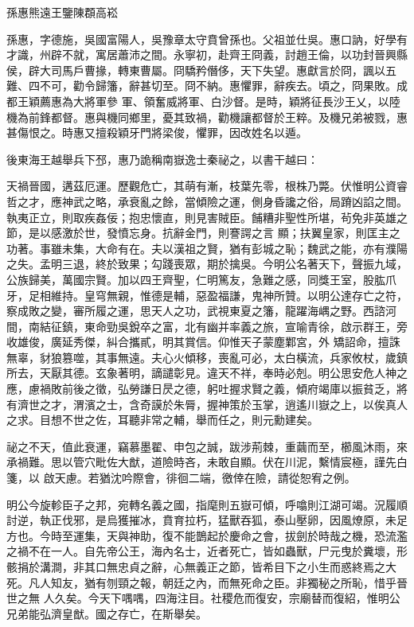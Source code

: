 
\begin{pinyinscope}

 孫惠熊遠王鑒陳頵高崧



 孫惠，字德施，吳國富陽人，吳豫章太守賁曾孫也。父祖並仕吳。惠口訥，好學有才識，州辟不就，寓居蕭沛之間。永寧初，赴齊王冏義，討趙王倫，以功封晉興縣侯，辟大司馬戶曹掾，轉東曹屬。冏驕矜僭侈，天下失望。惠獻言於冏，諷以五難、四不可，勸令歸籓，辭甚切至。冏不納。惠懼罪，辭疾去。頃之，冏果敗。成都王穎薦惠為大將軍參
 軍、領奮威將軍、白沙督。是時，穎將征長沙王乂，以陸機為前鋒都督。惠與機同鄉里，憂其致禍，勸機讓都督於王粹。及機兄弟被戮，惠甚傷恨之。時惠又擅殺穎牙門將梁俊，懼罪，因改姓名以遁。



 後東海王越舉兵下邳，惠乃詭稱南嶽逸士秦祕之，以書干越曰：



 天禍晉國，遘茲厄運。歷觀危亡，其萌有漸，枝葉先零，根株乃斃。伏惟明公資睿哲之才，應神武之略，承衰亂之餘，當傾險之運，側身昏讒之俗，局蹐凶諂之間。執夷正立，則取疾姦佞；抱忠懷直，則見害賊臣。餔糟非聖性所堪，茍免非英雄之節，是以感激於世，發憤忘身。抗辭金門，則謇諤之言
 顯；扶翼皇家，則匡主之功著。事雖未集，大命有在。夫以漢祖之賢，猶有彭城之恥；魏武之能，亦有濮陽之失。孟明三退，終於致果；勾踐喪眾，期於擒吳。今明公名著天下，聲振九域，公族歸美，萬國宗賢。加以四王齊聖，仁明篤友，急難之感，同獎王室，股肱爪牙，足相維持。皇穹無親，惟德是輔，惡盈福謙，鬼神所贊。以明公達存亡之符，察成敗之變，審所履之運，思天人之功，武視東夏之籓，龍躍海嵎之野。西諮河間，南結征鎮，東命勁吳銳卒之富，北有幽并率義之旅，宣喻青徐，啟示群王，旁收雄俊，廣延秀傑，糾合攜貳，明其賞信。仰惟天子蒙塵鄴宮，外
 矯詔命，擅誅無辜，豺狼篡噬，其事無遠。夫心火傾移，喪亂可必，太白橫流，兵家攸杖，歲鎮所去，天厭其德。玄象著明，謫譴彰見。違天不祥，奉時必剋。明公思安危人神之應，慮禍敗前後之徵，弘勞謙日昃之德，躬吐握求賢之義，傾府竭庫以振貧乏，將有濟世之才，渭濱之士，含奇謨於朱脣，握神策於玉掌，逍遙川嶽之上，以俟真人之求。目想不世之佐，耳聽非常之輔，舉而任之，則元勳建矣。



 祕之不天，值此衰運，竊慕墨翟、申包之誠，跋涉荊棘，重繭而至，櫛風沐雨，來承禍難。思以管穴毗佐大猷，道險時吝，未敢自顯。伏在川泥，繫情宸極，謹先白箋，以
 啟天慮。若猶沈吟際會，徘徊二端，徼倖在險，請從恕宥之例。



 明公今旋軫臣子之邦，宛轉名義之國，指麾則五嶽可傾，呼噏則江湖可竭。況履順討逆，執正伐邪，是烏獲摧冰，賁育拉朽，猛獸吞狐，泰山壓卵，因風燎原，未足方也。今時至運集，天與神助，復不能鵲起於慶命之會，拔劍於時哉之機，恐流濫之禍不在一人。自先帝公王，海內名士，近者死亡，皆如蟲獸，尸元曳於糞壞，形骸捐於溝澗，非其口無忠貞之辭，心無義正之節，皆希目下之小生而惑終焉之大死。凡人知友，猶有刎頸之報，朝廷之內，而無死命之臣。非獨秘之所恥，惜乎晉世之無
 人久矣。今天下喁喁，四海注目。社稷危而復安，宗廟替而復紹，惟明公兄弟能弘濟皇猷。國之存亡，在斯舉矣。




\end{pinyinscope}
